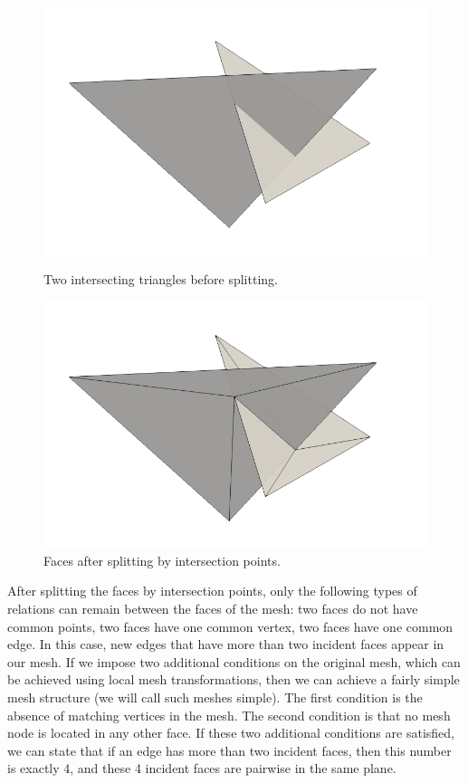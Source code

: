 \documentclass[
11pt,
tightenlines,
twoside,
onecolumn,
nofloats,
nobibnotes,
nofootinbib,
superscriptaddress,
noshowpacs,
centertags]
{revtex4}
\begin{document}
\begin{figure}[h]
  \centering
  \begin{minipage}[h]{0.38\textwidth}
    \includegraphics[width=\textwidth]{pics/pic_before_cut.png}
    \caption{Two intersecting triangles before splitting.}\label{fig:pic_before_cut}
  \end{minipage}
  \begin{minipage}[h]{0.38\textwidth}
    \includegraphics[width=\textwidth]{pics/pic_after_cut.png}
    \caption{Faces after splitting by intersection points.}\label{fig:pic_after_cut}
  \end{minipage}
\end{figure}

After splitting the faces by intersection points, only the following types of relations can remain between the faces of the mesh: two faces do not have common points, two faces have one common vertex, two faces have one common edge.
In this case, new edges that have more than two incident faces appear in our mesh.
If we impose two additional conditions on the original mesh, which can be achieved using local mesh transformations, then we can achieve a fairly simple mesh structure (we will call such meshes simple).
The first condition is the absence of matching vertices in the mesh.
The second condition is that no mesh node is located in any other face.
If these two additional conditions are satisfied, we can state that if an edge has more than two incident faces, then this number is exactly 4, and these 4 incident faces are pairwise in the same plane.
\end{document}
